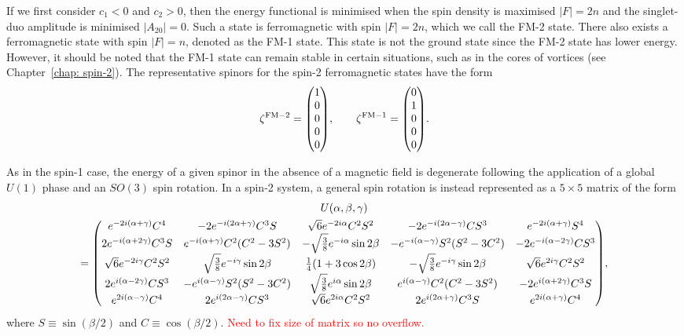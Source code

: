 If we first consider \(c_1 < 0\) and \(c_2 > 0\), then the energy functional is
minimised when  the spin density is maximised \(|F|=2n\)
and the singlet-duo amplitude is minimised \(|A_{20}|=0\).
Such a state is ferromagnetic with spin \(|F|=2n\), which we call the FM-2
state.
There also exists a ferromagnetic state with spin \(|F|=n\), denoted as the FM-1
state.
This state is not the ground state since the FM-2 state has lower
energy.
However, it should be noted that the FM-1 state can remain stable in
certain situations, such as in the cores of vortices (see
Chapter~\ref{chap: spin-2}).
The representative spinors for the spin-2 ferromagnetic states have the form
\begin{equation}
    \zeta^\mathrm{FM-2} = \mqty(1 \\ 0 \\ 0 \\ 0 \\ 0), \qquad
    \zeta^\mathrm{FM-1} = \mqty(0 \\ 1 \\ 0 \\ 0 \\ 0).
\end{equation}

As in the spin-1 case, the energy of a given spinor in the absence of a magnetic
field is degenerate following the application of a global \(U(1)\) phase and an
\(SO(3)\) spin rotation.
In a spin-2 system, a general spin rotation is instead represented as a
\(5\times 5\) matrix of the form
\begin{multline}\label{eq: spin-2-rotation-matrix}
    U(\alpha, \beta, \gamma) \\
    = \mqty(
    e^{-2i(\alpha + \gamma)}C^4 & -2e^{-i(2\alpha+\gamma)}C^3S
    & \sqrt{6}e^{-2i\alpha}C^2S^2 & -2e^{-i(2\alpha-\gamma)}CS^3
    & e^{-2i(\alpha + \gamma)}S^4
    \\
    2e^{-i(\alpha+2\gamma)}C^3S & e^{-i(\alpha+\gamma)}C^2(C^2-3S^2)
    & -\sqrt{\frac{3}{8}}e^{-i\alpha}\sin 2\beta
    & -e^{-i(\alpha-\gamma)}S^2(S^2-3C^2) & -2e^{-i(\alpha-2\gamma)}CS^3
    \\
    \sqrt{6}e^{-2i\gamma}C^2S^2 & \sqrt{\frac{3}{8}}e^{-i\gamma}\sin 2\beta
    & \frac{1}{4}(1+3\cos 2\beta)
    & -\sqrt{\frac{3}{8}}e^{-i\gamma}\sin 2\beta
    & \sqrt{6}e^{2i\gamma}C^2S^2
    \\
    2e^{i(\alpha-2\gamma)}CS^3 & -e^{i(\alpha-\gamma)}S^2(S^2-3C^2)
    & \sqrt{\frac{3}{8}}e^{i\alpha}\sin 2\beta
    & e^{i(\alpha-\gamma)}C^2(C^2-3S^2) & -2e^{i(\alpha+2\gamma)}C^3S
    \\
    e^{2i(\alpha - \gamma)}C^4 & 2e^{i(2\alpha-\gamma)}CS^3
    & \sqrt{6}e^{2i\alpha}C^2S^2 & 2e^{i(2\alpha+\gamma)}C^3S
    & e^{2i(\alpha + \gamma)}C^4
    ),
\end{multline}
where \(S \equiv \sin(\beta/2)\) and \(C \equiv \cos(\beta/2)\).
\textcolor{red}{Need to fix size of matrix so no overflow.}

